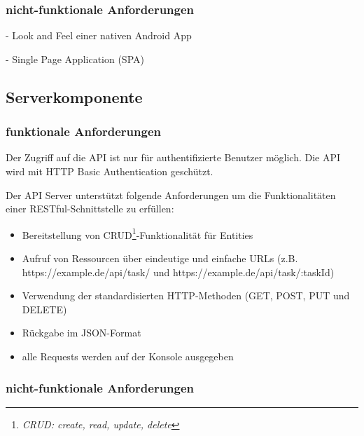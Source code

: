 \subsubsection{nicht-funktionale Anforderungen}

- Look and Feel einer nativen Android App

- Single Page Application (SPA)

\newpage
\subsection{Serverkomponente}

\subsubsection{funktionale Anforderungen}

Der Zugriff auf die API ist nur für authentifizierte Benutzer möglich. Die API wird mit HTTP Basic Authentication geschützt.

Der API Server unterstützt folgende Anforderungen um die Funktionalitäten einer RESTful-Schnittstelle zu erfüllen:

\begin{itemize}  
\item Bereitstellung von CRUD\footnote{\textit{CRUD: create, read, update, delete}}-Funktionalität für Entities
\item Aufruf von Ressourcen über eindeutige und einfache URLs (z.B. https://example.de/api/task/ und https://example.de/api/task/:taskId) 
\item Verwendung der standardisierten HTTP-Methoden (GET, POST, PUT und DELETE) 
\item Rückgabe im JSON-Format
\item alle Requests werden auf der Konsole ausgegeben
\end{itemize}


\subsubsection{nicht-funktionale Anforderungen}
